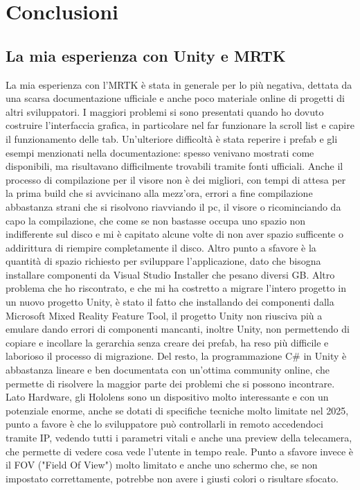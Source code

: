 \chapter{Conclusioni}
\pagestyle{plain}

\section{La mia esperienza con Unity e MRTK}
La mia esperienza con l'MRTK è stata in generale per lo più negativa, dettata da una scarsa documentazione ufficiale e anche poco materiale online di progetti di altri sviluppatori. I maggiori problemi si sono presentati quando ho dovuto costruire l'interfaccia grafica, in particolare nel far funzionare la scroll list e capire il funzionamento delle tab. Un'ulteriore difficoltà è stata reperire i prefab e gli esempi menzionati nella documentazione: spesso venivano mostrati come disponibili, ma risultavano difficilmente trovabili tramite fonti ufficiali. Anche il processo di compilazione per il visore non è dei migliori, con tempi di attesa per la prima build che si avvicinano alla mezz'ora, errori a fine compilazione abbastanza strani che si risolvono riavviando il pc, il visore o ricominciando da capo la compilazione, che come se non bastasse occupa uno spazio non indifferente sul disco e mi è capitato alcune volte di non aver spazio sufficente o addirittura di riempire completamente il disco. Altro punto a sfavore è la quantità di spazio richiesto per sviluppare l'applicazione, dato che bisogna installare componenti da Visual Studio Installer che pesano diversi GB. Altro problema che ho riscontrato, e che mi ha costretto a migrare l'intero progetto in un nuovo progetto Unity, è stato il fatto che installando dei componenti dalla Microsoft Mixed Reality Feature Tool, il progetto Unity non riusciva più a emulare dando errori di componenti mancanti, inoltre Unity, non permettendo di copiare e incollare la gerarchia senza creare dei prefab, ha reso più difficile e laborioso il processo di migrazione. Del resto, la programmazione C\# in Unity è abbastanza lineare e ben documentata con un'ottima community online, che permette di risolvere la maggior parte dei problemi che si possono incontrare. Lato Hardware, gli Hololens sono un dispositivo molto interessante e con un potenziale enorme, anche se dotati di specifiche tecniche molto limitate nel 2025, punto a favore è che lo sviluppatore può controllarli in remoto accedendoci tramite IP, vedendo tutti i parametri vitali e anche una preview della telecamera, che permette di vedere cosa vede l'utente in tempo reale. Punto a sfavore invece è il FOV ("Field Of View") molto limitato e anche uno schermo che, se non impostato correttamente, potrebbe non avere i giusti colori o risultare sfocato.
